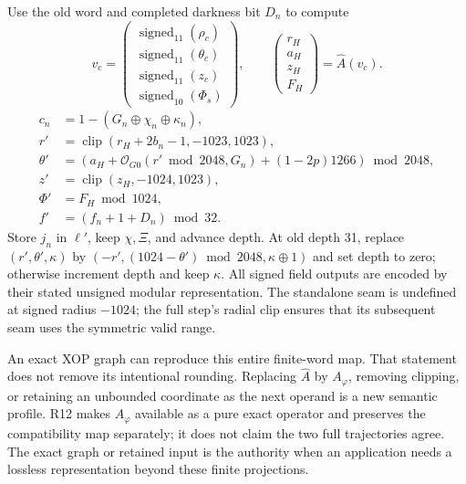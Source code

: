 Use the old word and completed darkness bit $D_n$ to compute
\begin{equation}
 v_c=\begin{pmatrix}
 \operatorname{signed}_{11}(\rho_c)\\
 \operatorname{signed}_{11}(\theta_c)\\
 \operatorname{signed}_{11}(z_c)\\
 \operatorname{signed}_{10}(\Phi_s)
 \end{pmatrix},\qquad
 \begin{pmatrix}r_H\\a_H\\z_H\\F_H\end{pmatrix}=\widehat A(v_c).
\end{equation}
\begin{align}
 c_n&=1-(G_n\oplus\chi_n\oplus\kappa_n),\\
 r'&=\operatorname{clip}(r_H+2b_n-1,-1023,1023),\\
 \theta'&=(a_H+\mathcal O_{G0}(r'\bmod2048,G_n)+(1-2p)1266)\bmod2048,\\
 z'&=\operatorname{clip}(z_H,-1024,1023),\\
 \Phi'&=F_H\bmod1024,\\
 f'&=(f_n+1+D_n)\bmod32.
\end{align}
Store $j_n$ in $\ell'$, keep $\chi,\Xi$, and advance depth. At old depth 31,
replace $(r',\theta',\kappa)$ by
$(-r',(1024-\theta')\bmod2048,\kappa\oplus1)$ and set depth to zero;
otherwise increment depth and keep $\kappa$. All signed field outputs are
encoded by their stated unsigned modular representation.
The standalone seam is undefined at signed radius $-1024$; the full step's
radial clip ensures that its subsequent seam uses the symmetric valid range.

An exact XOP graph can reproduce this entire finite-word map. That statement
does not remove its intentional rounding. Replacing $\widehat A$ by $A_\varphi$,
removing clipping, or retaining an unbounded coordinate as the next operand is
a new semantic profile. R12 makes $A_\varphi$ available as a pure exact operator
and preserves the compatibility map separately; it does not claim the two full
trajectories agree. The exact graph or retained input is the authority when an
application needs a lossless representation beyond these finite projections.

